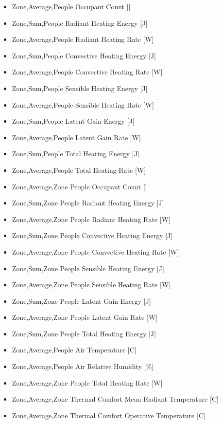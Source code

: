 \begin{itemize}
\item
  Zone,Average,People Occupant Count {[]}
\item
  Zone,Sum,People Radiant Heating Energy {[}J{]}
\item
  Zone,Average,People Radiant Heating Rate {[}W{]}
\item
  Zone,Sum,People Convective Heating Energy {[}J{]}
\item
  Zone,Average,People Convective Heating Rate {[}W{]}
\item
  Zone,Sum,People Sensible Heating Energy {[}J{]}
\item
  Zone,Average,People Sensible Heating Rate {[}W{]}
\item
  Zone,Sum,People Latent Gain Energy {[}J{]}
\item
  Zone,Average,People Latent Gain Rate {[}W{]}
\item
  Zone,Sum,People Total Heating Energy {[}J{]}
\item
  Zone,Average,People Total Heating Rate {[}W{]}
\item
  Zone,Average,Zone People Occupant Count {[]}
\item
  Zone,Sum,Zone People Radiant Heating Energy {[}J{]}
\item
  Zone,Average,Zone People Radiant Heating Rate {[}W{]}
\item
  Zone,Sum,Zone People Convective Heating Energy {[}J{]}
\item
  Zone,Average,Zone People Convective Heating Rate {[}W{]}
\item
  Zone,Sum,Zone People Sensible Heating Energy {[}J{]}
\item
  Zone,Average,Zone People Sensible Heating Rate {[}W{]}
\item
  Zone,Sum,Zone People Latent Gain Energy {[}J{]}
\item
  Zone,Average,Zone People Latent Gain Rate {[}W{]}
\item
  Zone,Sum,Zone People Total Heating Energy {[}J{]}
\item
  Zone,Average,People Air Temperature {[}C{]}
\item
  Zone,Average,People Air Relative Humidity {[}\%{]}
\item
  Zone,Average,Zone People Total Heating Rate {[}W{]}
\item
  Zone,Average,Zone Thermal Comfort Mean Radiant Temperature {[}C{]}
\item
  Zone,Average,Zone Thermal Comfort Operative Temperature {[}C{]}

\end{itemize}
